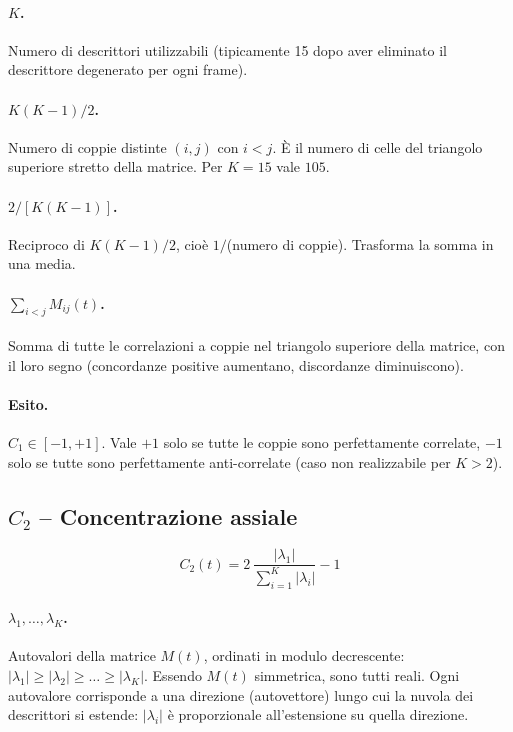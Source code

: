\documentclass[a4paper,11pt]{article}
\begin{document}
\paragraph{$K$.} Numero di descrittori utilizzabili (tipicamente 15 dopo
aver eliminato il descrittore degenerato per ogni frame).

\paragraph{$K(K-1)/2$.} Numero di coppie distinte $(i, j)$ con $i < j$.
È il numero di celle del triangolo superiore stretto della matrice.
Per $K = 15$ vale $105$.

\paragraph{$2/[K(K-1)]$.} Reciproco di $K(K-1)/2$, cioè $1/$(numero di
coppie). Trasforma la somma in una media.

\paragraph{$\sum_{i < j} M_{ij}(t)$.} Somma di tutte le correlazioni a
coppie nel triangolo superiore della matrice, con il loro segno
(concordanze positive aumentano, discordanze diminuiscono).

\paragraph{Esito.} $C_1 \in [-1, +1]$. Vale $+1$ solo se tutte le coppie
sono perfettamente correlate, $-1$ solo se tutte sono perfettamente
anti-correlate (caso non realizzabile per $K > 2$).

\subsection{$C_2$ -- Concentrazione assiale}

\[
C_2(t) = 2\,\frac{\lvert \lambda_1 \rvert}
                 {\sum_{i=1}^{K} \lvert \lambda_i \rvert} - 1
\]

\paragraph{$\lambda_1, \dots, \lambda_K$.} Autovalori della matrice
$M(t)$, ordinati in modulo decrescente:
$|\lambda_1| \ge |\lambda_2| \ge \dots \ge |\lambda_K|$. Essendo $M(t)$
simmetrica, sono tutti reali. Ogni autovalore corrisponde a una
direzione (autovettore) lungo cui la nuvola dei descrittori si estende:
$|\lambda_i|$ è proporzionale all'estensione su quella direzione.
\end{document}
